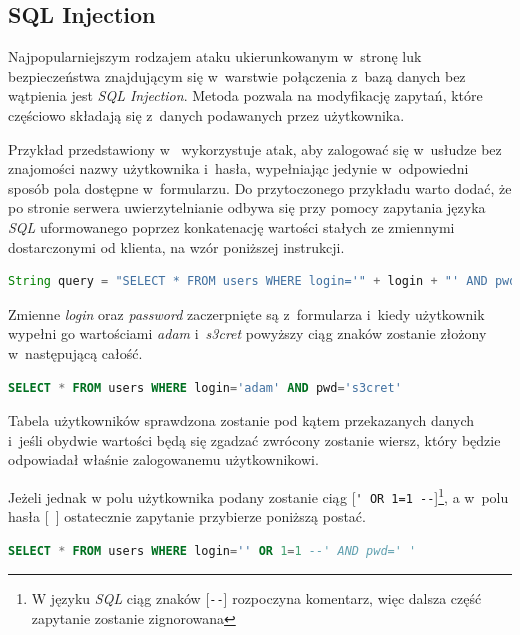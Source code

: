 \documentclass[11pt]{aghdpl}
\begin{document}

\subsection{SQL Injection}

Najpopularniejszym rodzajem ataku ukierunkowanym w~stronę luk bezpieczeństwa znajdującym się w~warstwie połączenia z~bazą danych bez wątpienia jest \emph{SQL Injection}. Metoda pozwala na modyfikację zapytań, które częściowo składają się z~danych podawanych przez użytkownika.

Przykład przedstawiony w~\cite{PSqlI} wykorzystuje atak, aby zalogować się w~usłudze bez znajomości nazwy użytkownika i~hasła, wypełniając jedynie w~odpowiedni sposób pola dostępne w~formularzu. Do przytoczonego przykładu warto dodać, że po stronie serwera uwierzytelnianie odbywa się przy pomocy zapytania języka \emph{SQL} uformowanego poprzez konkatenację wartości stałych ze zmiennymi dostarczonymi od klienta, na wzór poniższej instrukcji.

\begin{lstlisting}[language=Java]
String query = "SELECT * FROM users WHERE login='" + login + "' AND pwd='" + password + "'";
\end{lstlisting}

Zmienne \emph{login} oraz \emph{password} zaczerpnięte są z~formularza i~kiedy użytkownik wypełni go wartościami \emph{adam} i~\emph{s3cret} powyższy ciąg znaków zostanie złożony w~następującą całość.

\begin{lstlisting}[language=SQL]
SELECT * FROM users WHERE login='adam' AND pwd='s3cret'
\end{lstlisting}

Tabela użytkowników sprawdzona zostanie pod kątem przekazanych danych i~jeśli obydwie wartości będą się zgadzać zwrócony zostanie wiersz, który będzie odpowiadał właśnie zalogowanemu użytkownikowi.

Jeżeli jednak w polu użytkownika podany zostanie ciąg [\lstinline$' OR 1=1 --$]\footnote{W języku \emph{SQL} ciąg znaków [\lstinline$--$] rozpoczyna komentarz, więc dalsza część zapytanie zostanie zignorowana}, a w~polu hasła [\lstinline$ $] ostatecznie zapytanie przybierze poniższą postać.

\begin{lstlisting}[language=SQL]
SELECT * FROM users WHERE login='' OR 1=1 --' AND pwd=' '
\end{lstlisting}
\end{document}

